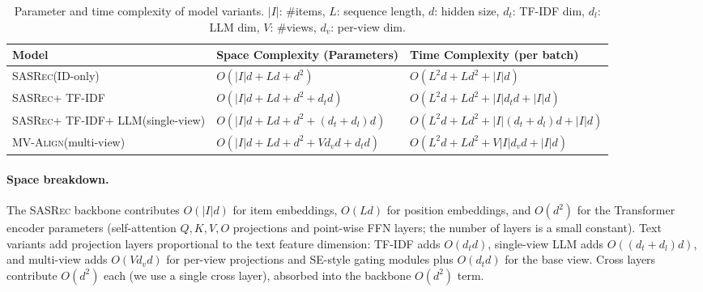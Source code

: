 \documentclass[sigconf,natbib=true]{acmart}
\newcommand{\model}{\textsc{MV-Align}\xspace}
\newcommand{\base}{\textsc{SASRec}\xspace}
\newcommand{\tfidf}{\textsc{TF-IDF}\xspace}
\newcommand{\llm}{\textsc{LLM}\xspace}
\begin{document}
\begin{table}[t]
\caption{Parameter and time complexity of model variants.
$|I|$: \#items, $L$: sequence length, $d$: hidden size,
$d_t$: \tfidf dim, $d_l$: \llm dim, $V$: \#views, $d_v$: per-view dim.}
\label{tab:complexity}
\centering
\small
\begin{tabular}{lll}
\toprule
\textbf{Model} & \textbf{Space Complexity (Parameters)} & \textbf{Time Complexity (per batch)} \\
\midrule
\base (ID-only) & $O(|I|d + Ld + d^2)$ & $O(L^2d + Ld^2 + |I|d)$ \\
\base + \tfidf & $O(|I|d + Ld + d^2 + d_t d)$ & $O(L^2d + Ld^2 + |I|d_t d + |I|d)$ \\
\base + \tfidf + \llm (single-view) & $O(|I|d + Ld + d^2 + (d_t{+}d_l)d)$ & $O(L^2d + Ld^2 + |I|(d_t{+}d_l)d + |I|d)$ \\
\model (multi-view) & $O(|I|d + Ld + d^2 + Vd_v d + d_t d)$ & $O(L^2d + Ld^2 + V|I|d_v d + |I|d)$ \\
\bottomrule
\end{tabular}
\end{table}

\paragraph{Space breakdown.}
The \base backbone contributes $O(|I|d)$ for item embeddings,
$O(Ld)$ for position embeddings, and $O(d^2)$ for the
Transformer encoder parameters (self-attention $Q,K,V,O$
projections and point-wise FFN layers; the number of layers
is a small constant). Text variants add projection layers
proportional to the text feature dimension: \tfidf adds
$O(d_t d)$, single-view \llm adds $O((d_t + d_l)d)$, and
multi-view adds $O(V d_v d)$ for per-view projections and
SE-style gating modules plus $O(d_t d)$ for the base view. Cross layers
contribute $O(d^2)$ each (we use a single cross layer),
absorbed into the backbone $O(d^2)$ term.
\end{document}
